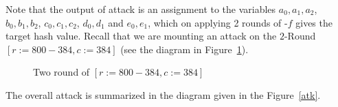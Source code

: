 Note that the output of attack is an assignment to the variables $a_0, a_1, a_2$, $b_0, b_1, b_2$, $c_0, c_1, c_2$, $d_0, d_1$ and $e_0, e_1$, which on applying 2 rounds of \KECCAK-$f$ gives the target hash value. Recall that we are mounting an attack on the $2$-Round \KECCAK{}$[r:=800-384, c:=384]$ (see the diagram in Figure~\ref{two_rnd}).
\begin{figure}
\begin{center}
\caption{Two round of \KECCAK{}$[r:=800-384, c:=384]$\label{two_rnd}}
\end{center}
\end{figure}
%
%
The overall attack is summarized in the  diagram given in the Figure~\ref{atk}. 
%

